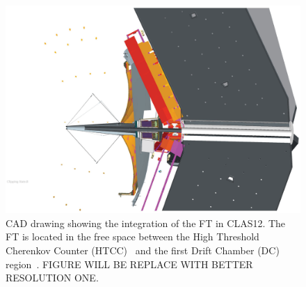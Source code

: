 \begin{figure}[th!]
\centering 
\includegraphics[width=\columnwidth]{./fig/ft_cad.eps} 
\caption{CAD drawing showing the integration of the FT in CLAS12. The FT is located in the free space between
  the High Threshold Cherenkov Counter (HTCC)~\cite{htcc} and the first Drift Chamber (DC) region~\cite{dc}. FIGURE WILL BE REPLACE WITH BETTER RESOLUTION ONE.} 
\label{fig:ftinclas12} 
\end{figure}
